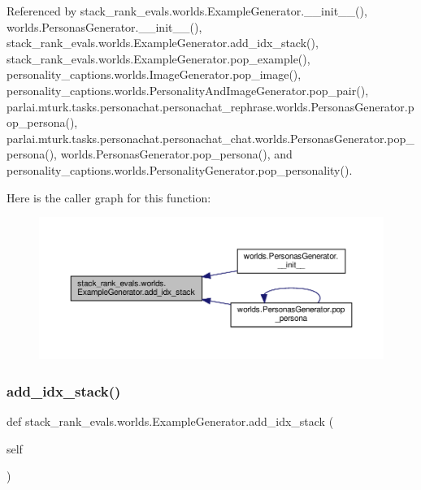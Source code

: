 Referenced by stack\+\_\+rank\+\_\+evals.\+worlds.\+Example\+Generator.\+\_\+\+\_\+init\+\_\+\+\_\+(), worlds.\+Personas\+Generator.\+\_\+\+\_\+init\+\_\+\+\_\+(), stack\+\_\+rank\+\_\+evals.\+worlds.\+Example\+Generator.\+add\+\_\+idx\+\_\+stack(), stack\+\_\+rank\+\_\+evals.\+worlds.\+Example\+Generator.\+pop\+\_\+example(), personality\+\_\+captions.\+worlds.\+Image\+Generator.\+pop\+\_\+image(), personality\+\_\+captions.\+worlds.\+Personality\+And\+Image\+Generator.\+pop\+\_\+pair(), parlai.\+mturk.\+tasks.\+personachat.\+personachat\+\_\+rephrase.\+worlds.\+Personas\+Generator.\+pop\+\_\+persona(), parlai.\+mturk.\+tasks.\+personachat.\+personachat\+\_\+chat.\+worlds.\+Personas\+Generator.\+pop\+\_\+persona(), worlds.\+Personas\+Generator.\+pop\+\_\+persona(), and personality\+\_\+captions.\+worlds.\+Personality\+Generator.\+pop\+\_\+personality().

Here is the caller graph for this function\+:
\nopagebreak
\begin{figure}[H]
\begin{center}
\leavevmode
\includegraphics[width=350pt]{classstack__rank__evals_1_1worlds_1_1ExampleGenerator_a9bc7f39d14003d695ad66b624607dc05_icgraph}
\end{center}
\end{figure}
\mbox{\label{classstack__rank__evals_1_1worlds_1_1ExampleGenerator_a9bc7f39d14003d695ad66b624607dc05}} 
\subsubsection{\texorpdfstring{add\+\_\+idx\+\_\+stack()}{add\_idx\_stack()}\hspace{0.1cm}{\footnotesize\ttfamily [2/2]}}
{\footnotesize\ttfamily def stack\+\_\+rank\+\_\+evals.\+worlds.\+Example\+Generator.\+add\+\_\+idx\+\_\+stack (\begin{DoxyParamCaption}\item[{}]{self }\end{DoxyParamCaption})}




